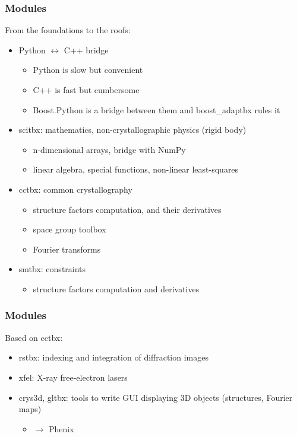 \documentclass[10pt]{beamer}
\begin{document}
\begin{frame}[fragile]
\frametitle{Modules}
From the foundations to the roofs:
\begin{itemize}
\item Python $\leftrightarrow$ C++ bridge
\begin{itemize}
\item Python is slow but convenient
\item C++ is fast but cumbersome
\item Boost.Python is a bridge between them and boost\_adaptbx rules it
\end{itemize}
\item scitbx: mathematics, non-crystallographic physics (rigid body)
\begin{itemize}
\item n-dimensional arrays, bridge with NumPy
\item linear algebra, special functions, non-linear least-squares
\end{itemize}
\item cctbx: common crystallography
\begin{itemize}
\item structure factors computation, and their derivatives
\item space group toolbox
\item Fourier transforms
\end{itemize}
\item smtbx: constraints
\begin{itemize}
\item structure factors computation and derivatives
\end{itemize}
\end{itemize}
\end{frame}

\begin{frame}[fragile]
\frametitle{Modules}
Based on cctbx:
\begin{itemize}
\item rstbx: indexing and integration of diffraction images
\item xfel: X-ray free-electron lasers
\item crys3d, gltbx: tools to write GUI displaying 3D objects (structures, Fourier maps)
\begin{itemize}
\item $\longrightarrow$ Phenix
\end{itemize}
\end{itemize}
\end{frame}
\end{document}
